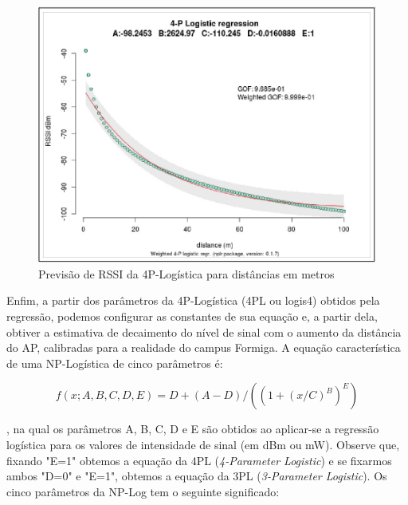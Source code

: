 \documentclass[
	12pt,				%
	openright,			%
	twoside,			%
	a4paper,			%
	english,			%
	french,				%
	spanish,			%
	brazil				%
	]{abntex2}
\begin{document}
\begin{figure}[htb]
	\caption{\label{logistic_regression_2} Previsão de RSSI da 4P-Logística para distâncias em metros}
	\begin{center}
		\includegraphics[scale=0.47]{images/logistic-regression-2.jpg}
	\end{center}
\end{figure}

Enfim, a partir dos parâmetros da 4P-Logística (4PL ou logis4) obtidos pela regressão, podemos configurar as constantes de sua equação e, a partir dela, obtiver a estimativa de decaimento do nível de sinal com o aumento da distância do AP, calibradas para a realidade do campus Formiga. A equação característica de uma NP-Logística de cinco parâmetros é:

\begin{equation}
f(x; A,B,C,D,E) = D + (A-D) / ( (1+(x/C)^B)^E )
\end{equation}

, na qual os parâmetros A, B, C, D e E são obtidos ao aplicar-se a regressão logística para os valores de intensidade de sinal (em dBm ou mW). Observe que, fixando "E=1" obtemos a equação da 4PL (\textit{4-Parameter Logistic}) e se fixarmos ambos "D=0" e "E=1", obtemos a equação da 3PL (\textit{3-Parameter Logistic}). Os cinco parâmetros da NP-Log tem o seguinte significado:
\end{document}
